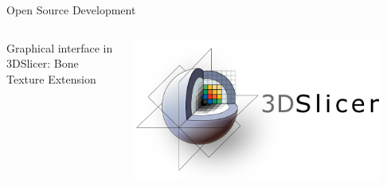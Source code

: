 \documentclass[10pt,aspectratio=169]{beamer}
\begin{document}
\begin{frame}{Open Source Development}
  \begin{columns}[onlytextwidth]
    \begin{block}{Graphical interface in 3DSlicer: Bone Texture Extension}
    \end{block}
    \centering
    \includegraphics[width=0.9\textwidth]{./logos/logo_slicer_horizontal.png}
  \end{columns}
\end{frame}
\end{document}
